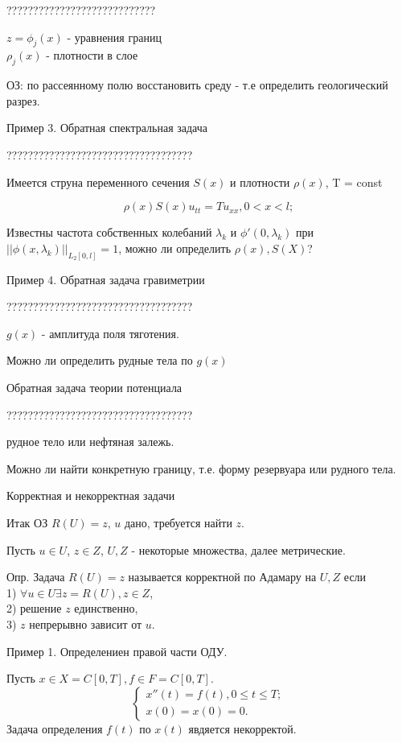 \documentclass{article}
\begin{document}
????????????????????????????

$z = \phi_j(x)$ - уравнения границ\\
$\rho_j(x)$ - плотности в слое

ОЗ: по рассеянному полю восстановить среду - т.е определить геологический разрез.

Пример 3. Обратная спектральная задача

???????????????????????????????????

Имеется струна переменного сечения $S(x)$ и плотности $\rho(x)$, T = const

$$ \rho(x) S(x) u_{tt} = T u_{xx}, 0 < x < l; $$

Известны частота собственных колебаний ${\lambda_k}$ и ${\phi'(0,\lambda_k)}$ при $|| \phi(x,\lambda_k)||_{L_2[0,l]}=1$, можно ли определить $\rho(x), S(X)$?

Пример 4. Обратная задача гравиметрии

???????????????????????????????????

$g(x)$ - амплитуда поля тяготения. 

Можно ли определить рудные тела по $g(x)$


Обратная задача теории потенциала

???????????????????????????????????

рудное тело или нефтяная залежь.

Можно ли найти конкретную границу, т.е. форму резервуара или рудного тела.


\centerline{\sc Корректная и некорректная задачи}

Итак ОЗ $R(U) = z$, $u$ дано, требуется найти $z$.

Пусть $u \in U$, $z \in Z$, $U,Z$ - некоторые множества, далее метрические.

Опр. Задача $R(U) = z$ называется корректной по Адамару на $U,Z$ если\\
1) $\forall u \in U \exists z = R(U), z \in Z$,\\
2) решение $z$ единственно,\\
3) $z$ непрерывно зависит от $u$.

Пример 1. Определениен правой части ОДУ.

Пусть $x \in X = C[0,T], f \in F = C[0,T]$.
$$
\begin{cases} 
x''(t) = f(t), 0 \leqslant t \leqslant T;\\
x(0) = x(0) = 0.
\end{cases}
$$ 
Задача определения $f(t)$ по $x(t)$ явдяется некорректой.
\end{document}
